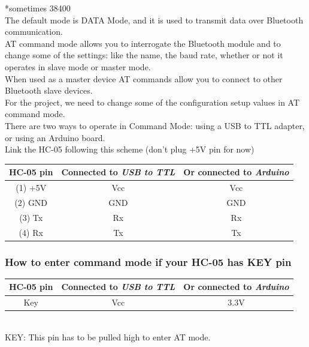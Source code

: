 *sometimes 38400\\

The default mode is DATA Mode, and it is used to transmit data over Bluetooth communication.\\
AT command mode allows you to interrogate the Bluetooth module and to change some of the settings: like the name, the baud rate, whether or not it operates in slave mode or master mode.\\
When used as a master device AT commands allow you to connect to other Bluetooth slave devices.\\
For the project, we need to change some of the configuration setup values in AT command mode. \\

There are two ways to operate in Command Mode: using a USB to TTL adapter, or using an Arduino board.\\
Link the HC-05 following this scheme (don’t plug +5V pin for now)\\

\begin{tabular}{|c|c|c|}
	\hline 
	\textbf{HC-05 pin} & \textbf{Connected to \textit{USB to TTL}} & \textbf{Or connected to \textit{Arduino}} \\ 
	\hline 
	(1) +5V & Vcc & Vcc \\ 
	\hline 
	(2) GND & GND & GND \\ 
	\hline 
	(3) Tx & Rx & Rx \\ 
	\hline 
	(4) Rx & Tx & Tx \\ 
	\hline 
\end{tabular} 

\subsubsection{How to enter command mode if your HC-05 has KEY pin}
\begin{tabular}{|c|c|c|}
	\hline 
	\textbf{HC-05 pin} & \textbf{Connected to \textit{USB to TTL}} & \textbf{Or connected to \textit{Arduino}} \\ 
	\hline 
	Key & Vcc & 3.3V \\ 
	\hline 
\end{tabular} \\

KEY: This pin has to be pulled high to enter AT mode.

